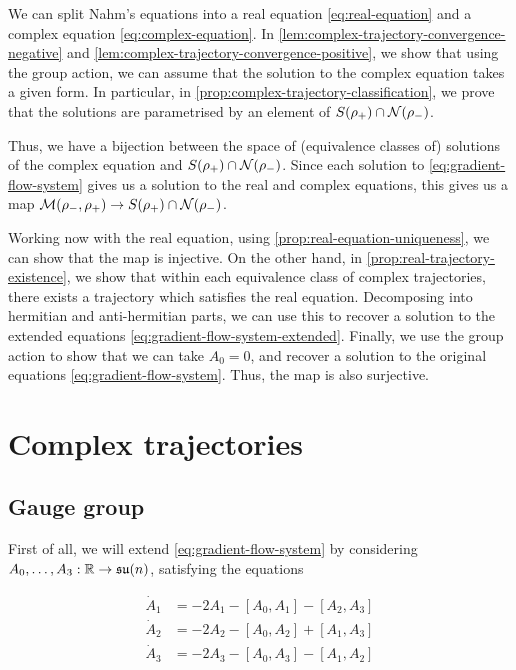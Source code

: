 \documentclass{article}
\newcommand{\su}{\mathfrak{su}}
\begin{document}
We can split Nahm's equations into a real equation \cref{eq:real-equation} and a complex equation \cref{eq:complex-equation}. In \cref{lem:complex-trajectory-convergence-negative} and \cref{lem:complex-trajectory-convergence-positive}, we show that using the group action, we can assume that the solution to the complex equation takes a given form. In particular, in \cref{prop:complex-trajectory-classification}, we prove that the solutions are parametrised by an element of \(S(\rho_+) \cap \mathcal{N}(\rho_-)\).

Thus, we have a bijection between the space of (equivalence classes of) solutions of the complex equation and \(S(\rho_+) \cap \mathcal{N}(\rho_-)\). Since each solution to \cref{eq:gradient-flow-system} gives us a solution to the real and complex equations, this gives us a map \(\mathcal{M}(\rho_-, \rho_+) \to S(\rho_+) \cap \mathcal{N}(\rho_-)\).

Working now with the real equation, using \cref{prop:real-equation-uniqueness}, we can show that the map is injective. On the other hand, in \cref{prop:real-trajectory-existence}, we show that within each equivalence class of complex trajectories, there exists a trajectory which satisfies the real equation. Decomposing into hermitian and anti-hermitian parts, we can use this to recover a solution to the extended equations \cref{eq:gradient-flow-system-extended}. Finally, we use the group action to show that we can take \(A_0 = 0\), and recover a solution to the original equations \cref{eq:gradient-flow-system}. Thus, the map is also surjective.

\section{Complex trajectories}

\subsection{Gauge group}

First of all, we will extend \cref{eq:gradient-flow-system} by considering \(A_0, \dots, A_3 : \R \to \su(n)\), satisfying the equations

\begin{equation}
    \label{eq:gradient-flow-system-extended}
    \begin{split}
        \dot A_1 &= -2A_1 - [A_0, A_1] - [A_2, A_3] \\
        \dot A_2 &= -2A_2 - [A_0, A_2] + [A_1, A_3] \\
        \dot A_3 &= -2A_3 - [A_0, A_3] - [A_1, A_2] \\
    \end{split}
\end{equation}
\end{document}
